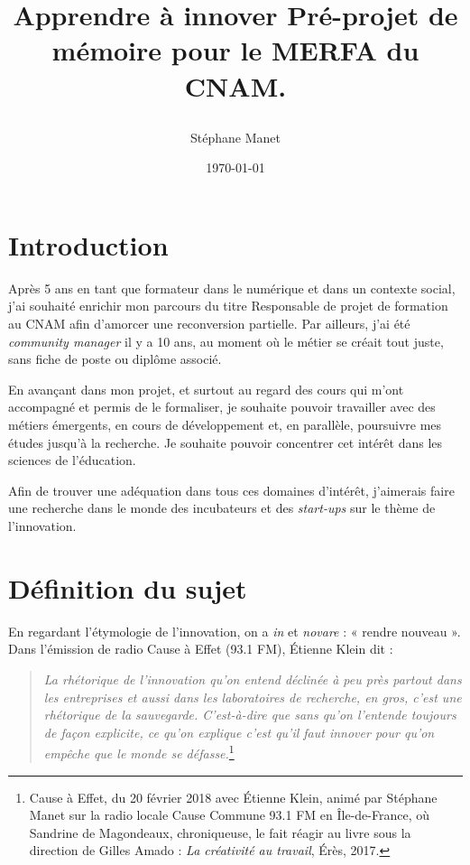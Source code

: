 \documentclass{article}
\author{Stéphane Manet}
\date{\today}
\title{%
    \begin{minipage}\linewidth
        \centering\bfseries
        Apprendre à innover
        \vskip3pt
        \large Pré-projet de mémoire pour le MERFA du CNAM.
    \end{minipage}
}
\begin{document}
\maketitle %
\tableofcontents


\pagebreak

\section*{Introduction}

Après 5 ans en tant que formateur dans le numérique et dans un contexte social, j'ai souhaité enrichir mon parcours du titre Responsable de projet de formation au CNAM afin d'amorcer une reconversion partielle. 
Par ailleurs, j'ai été \emph{community manager} il y a 10 ans, au moment où le métier se créait tout juste, sans fiche de poste ou diplôme associé. 

En avançant dans mon projet, et surtout au regard des cours qui m'ont accompagné et permis de le formaliser, je souhaite pouvoir travailler avec des métiers émergents, en cours de développement et, en parallèle, poursuivre mes études jusqu'à la recherche. Je souhaite pouvoir concentrer cet intérêt dans les sciences de l'éducation.

Afin de trouver une adéquation dans tous ces domaines d'intérêt, j'aimerais faire une recherche dans le monde des incubateurs et des \emph{start-ups} sur le thème de l'innovation.

\section{Définition du sujet}

En regardant l'étymologie de l'innovation, on a \emph{in} et \emph{novare} : « rendre nouveau ». Dans l'émission de radio Cause à Effet (93.1 FM), Étienne Klein dit :

\begin{quote}
\textit{La rhétorique de l'innovation qu'on entend déclinée à peu près partout dans les entreprises et aussi dans les laboratoires de recherche, en gros, c'est une rhétorique de la sauvegarde. C'est-à-dire que sans qu'on l'entende toujours de façon explicite, ce qu'on explique c'est qu'il faut innover pour qu'on empêche que le monde se défasse.}\footnote{Cause à Effet, du 20 février 2018 avec Étienne Klein, animé par Stéphane Manet sur la radio locale Cause Commune 93.1 FM en Île-de-France, où Sandrine de Magondeaux, chroniqueuse, le fait réagir au livre sous la direction de Gilles Amado : \emph{La créativité au travail}, Érès, 2017.}
\end{quote} 
\end{document}
